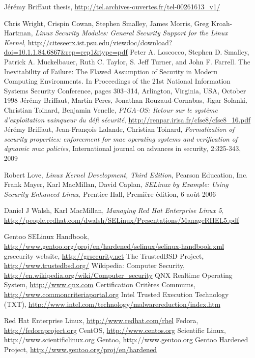 \documentclass[pdftex,a4paper,titlepage,11pt]{article}
\begin{document}
\begin{thebibliography}{40}

 Jérémy Briffaut thesis, \url{http://tel.archives-ouvertes.fr/tel-00261613_v1/}

 Chris Wright, Crispin Cowan, Stephen Smalley, James Morris, Greg Kroah-Hartman, \textit{Linux Security Modules: General Security Support for the Linux Kernel}, \url{http://citeseerx.ist.psu.edu/viewdoc/download?doi=10.1.1.84.6867&rep=rep1&type=pdf}
 Peter A. Loscocco, Stephen D. Smalley, Patrick A. Muckelbauer, Ruth C. Taylor, S. Jeff Turner, and John F. Farrell. The Inevitability of Failure: The Flawed Assumption of Security in Modern Computing Environments. In Proceedings of the 21st National Information Systems Security Conference, pages 303–314, Arlington, Virginia, USA, October 1998
 Jérémy Briffaut, Martin Peres, Jonathan Rouzaud-Cornabas, Jigar Solanki, Christian Toinard, Benjamin Venelle, \textit{PIGA-OS: Retour sur le système d'exploitation vainqueur du défi sécurité}, \url{http://renpar.irisa.fr/cfse8/cfse8_16.pdf}
 Jérémy Briffaut, Jean-François Lalande, Christian Toinard, \textit{Formalization of security properties: enforcement for mac operating systems and verification of dynamic mac policies}, International journal on advances in security, 2:325-343, 2009

 Robert Love, \textit{Linux Kernel Development, Third Edition}, Pearson Education, Inc.
 Frank Mayer, Karl MacMillan, David Caplan, \textit{SELinux by Example: Using Security Enhanced Linux}, Prentice Hall, Première édition, 6 août 2006

 Daniel J Walsh, Karl MacMillan, \textit{Managing Red Hat Enterprise Linux 5}, \url{http://people.redhat.com/dwalsh/SELinux/Presentations/ManageRHEL5.pdf}

 Gentoo SELinux Handbook,  \url{http://www.gentoo.org/proj/en/hardened/selinux/selinux-handbook.xml}
 grsecurity website, \url{http://grsecurity.net}
 The TrustedBSD Project, \url{http://www.trustedbsd.org/}
 Wikipedia: Computer Security, \url{http://en.wikipedia.org/wiki/Computer_security}
 QNX Realtime Operating System, \url{http://www.qnx.com}
 Certification Critères Commums, \url{http://www.commoncriteriaportal.org}
 Intel Trusted Execution Technology (TXT), \url{http://www.intel.com/technology/malwarereduction/index.htm}

 Red Hat Enterprise Linux, \url{http://www.redhat.com/rhel}
 Fedora, \url{http://fedoraproject.org}
 CentOS, \url{http://www.centos.org}
 Scientific Linux, \url{http://www.scientificlinux.org}
 Gentoo, \url{http://www.gentoo.org}
 Gentoo Hardened Project, \url{http://www.gentoo.org/proj/en/hardened}

\end{thebibliography}
\end{document}
